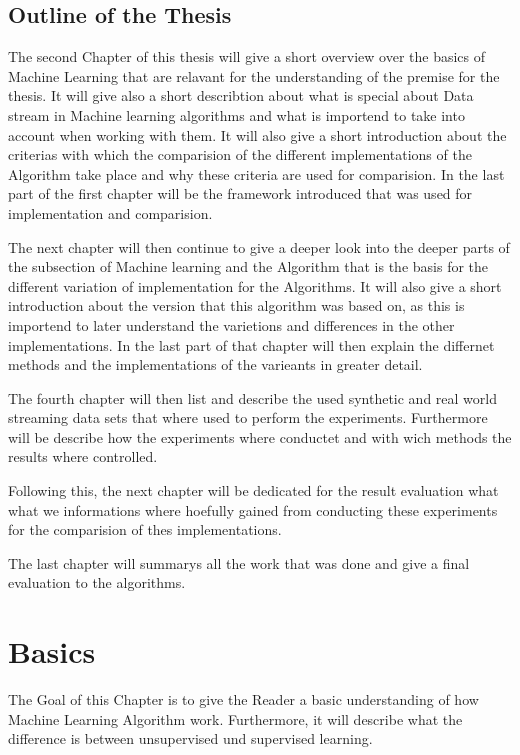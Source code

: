 \documentclass[12pt,oneside,a4paper,parskip]{scrbook}
\begin{document}
\section{Outline of the Thesis} 

The second Chapter of this thesis will give a short overview over the basics of Machine Learning that are relavant for
the understanding of the premise for the thesis. It will give also a short describtion about what is special about Data stream 
in Machine learning algorithms and what is importend to take into account when working with them.
It will also give a short introduction about the criterias with which the comparision of the different implementations 
of the Algorithm take place and why these criteria are used for  comparision.
In the last part of the first chapter will be the framework introduced that was used for implementation and comparision.

The next chapter will then continue to give a deeper look into the deeper parts of the subsection of Machine learning 
and the Algorithm that is the basis for the different variation of implementation for the Algorithms.
It will also give a short introduction about the version that this algorithm was based on, as this is importend to later understand
the varietions and differences in the other implementations.
In the last part of that chapter will then explain the differnet methods and the implementations of the varieants in greater detail.

The fourth chapter will then list and describe the used synthetic and real world streaming data sets that where used to 
perform the experiments.
Furthermore will be describe how the experiments where conductet and with wich methods the results where controlled.

Following this, the next chapter will be dedicated for the result evaluation what what we informations where hoefully gained
from conducting these experiments for the comparision of thes implementations.

The last chapter will summarys all the work that was done and give a final evaluation to the algorithms.

\chapter{Basics}
The Goal of this Chapter is to give the Reader a basic understanding of how Machine Learning Algorithm work. 
Furthermore, it will describe what the difference is between unsupervised und supervised learning. 
\end{document}
